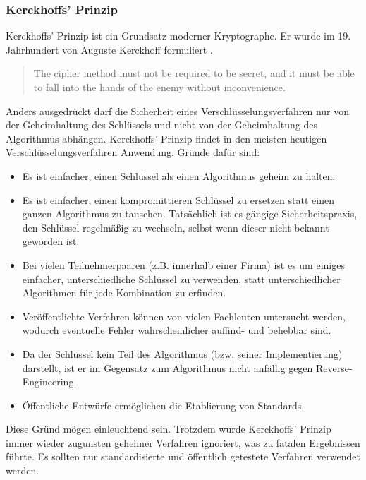 \subsubsection{Kerckhoffs' Prinzip}

Kerckhoffs' Prinzip ist ein Grundsatz moderner Kryptographe. Er wurde im 19. Jahrhundert von Auguste Kerckhoff formuliert \cite{Kerckhoffs}.
\begin{quote}
The cipher method must not be required to be secret, and it must be able to fall into the hands of the enemy without inconvenience.
\end{quote}
Anders ausgedrückt darf die Sicherheit eines Verschlüsselungsverfahren nur von der Geheimhaltung des Schlüssels und nicht von der Geheimhaltung des Algorithmus abhängen.
Kerckhoffs' Prinzip findet in den meisten heutigen Verschlüsselungsverfahren Anwendung. Gründe dafür sind:
\begin{itemize}
\item Es ist einfacher, einen Schlüssel als einen Algorithmus geheim zu halten.
\item Es ist einfacher, einen kompromittieren Schlüssel zu ersetzen statt einen ganzen Algorithmus zu tauschen. Tatsächlich ist es gängige Sicherheitspraxis, den Schlüssel regelmäßig zu wechseln, selbst wenn dieser nicht bekannt geworden ist.
\item Bei vielen Teilnehmerpaaren (z.B. innerhalb einer Firma) ist es um einiges einfacher, unterschiedliche Schlüssel zu verwenden, statt unterschiedlicher Algorithmen für jede Kombination zu erfinden.
\item Veröffentlichte Verfahren können von vielen Fachleuten untersucht werden, wodurch eventuelle Fehler wahrscheinlicher auffind- und behebbar sind.
\item Da der Schlüssel kein Teil des Algorithmus (bzw. seiner Implementierung) darstellt, ist er im Gegensatz zum Algorithmus nicht anfällig gegen Reverse-Engineering.
\item Öffentliche Entwürfe ermöglichen die Etablierung von Standards.
\end{itemize}
Diese Gründ mögen einleuchtend sein. Trotzdem wurde Kerckhoffs' Prinzip immer wieder zugunsten geheimer Verfahren ignoriert, was zu fatalen Ergebnissen führte. Es sollten nur standardisierte und öffentlich getestete Verfahren verwendet werden.


